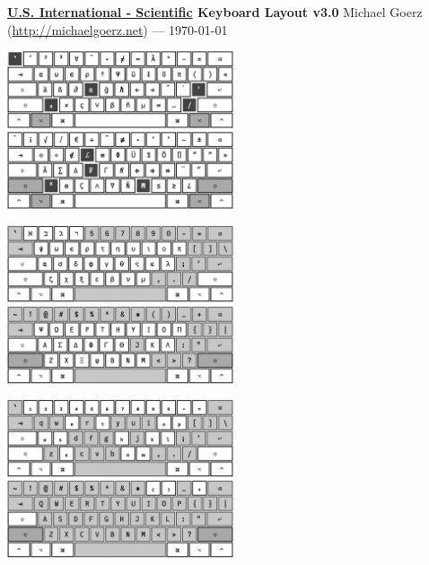 \documentclass[letter,10pt]{article}
\title{\Title}
\author{\Author}
\date{\today}
\begin{document}
\begin{center}
  \textbf{\underline{U.S. International - Scientific} Keyboard Layout v3.0} \hfill Michael Goerz (\url{http://michaelgoerz.net}) — \today
\end{center}

\includegraphics[width=0.5\textwidth]{pics/option-lc.png}%
\includegraphics[width=0.5\textwidth]{pics/option-shift.png}

\vspace{2mm}

\includegraphics[width=0.5\textwidth]{pics/greek-lc.png}%
\includegraphics[width=0.5\textwidth]{pics/greek-shift.png}

\vspace{2mm}

\includegraphics[width=0.5\textwidth]{pics/subscript-lc.png}%
\includegraphics[width=0.5\textwidth]{pics/subscript-shift.png}
\vspace{2mm}
\end{document}
